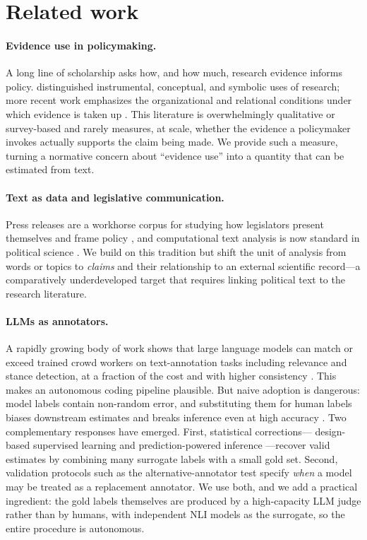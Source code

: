 \section{Related work}
\label{sec:related}

\paragraph{Evidence use in policymaking.} A long line of scholarship asks how, and how much,
research evidence informs policy. \citet{weiss1979many} distinguished instrumental, conceptual,
and symbolic uses of research; more recent work emphasizes the organizational and relational
conditions under which evidence is taken up \citep{oliver2022works,bogenschneider2019revisiting}.
This literature is overwhelmingly qualitative or survey-based and rarely measures, at scale,
whether the evidence a policymaker invokes actually supports the claim being made. We provide such
a measure, turning a normative concern about ``evidence use'' into a quantity that can be estimated
from text.

\paragraph{Text as data and legislative communication.} Press releases are a workhorse corpus for
studying how legislators present themselves and frame policy \citep{grimmer2013representational},
and computational text analysis is now standard in political science
\citep{grimmer2013text,monroe2008fightin}. We build on this tradition but shift the unit of
analysis from words or topics to \emph{claims} and their relationship to an external scientific
record---a comparatively underdeveloped target that requires linking political text to the
research literature.

\paragraph{LLMs as annotators.} A rapidly growing body of work shows that large language models can
match or exceed trained crowd workers on text-annotation tasks including relevance and stance
detection, at a fraction of the cost and with higher consistency
\citep{gilardi2023chatgpt,alizadeh2023open,ziems2024can}. This makes an autonomous coding pipeline
plausible. But naive adoption is dangerous: model labels contain non-random error, and substituting
them for human labels biases downstream estimates and breaks inference even at high accuracy
\citep{egami2023dsl}. Two complementary responses have emerged. First, statistical corrections---%
design-based supervised learning \citep{egami2023dsl} and prediction-powered inference
\citep{angelopoulos2023ppi}---recover valid estimates by combining many surrogate labels with a
small gold set. Second, validation protocols such as the alternative-annotator test
\citep{calderon2025alttest} specify \emph{when} a model may be treated as a replacement annotator.
We use both, and we add a practical ingredient: the gold labels themselves are produced by a
high-capacity LLM judge rather than by humans, with independent NLI models as the surrogate, so the
entire procedure is autonomous.

